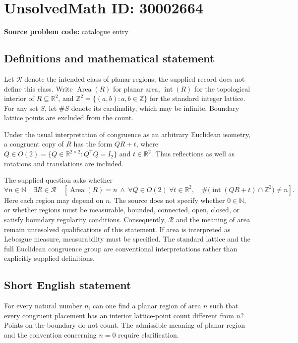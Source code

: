 \documentclass[11pt]{article}
\newcommand{\N}{\mathbb{N}}
\newcommand{\Z}{\mathbb{Z}}
\newcommand{\R}{\mathbb{R}}
\begin{document}
\section*{UnsolvedMath ID: 30002664}
\textbf{Source problem code:} catalogue entry
\subsection{Definitions and mathematical statement}
Let \(\mathcal R\) denote the intended class of planar regions; the supplied record does not define this class. Write \(\operatorname{Area}(R)\) for planar area, \(\operatorname{int}(R)\) for the topological interior of \(R\subseteq\R^2\), and \(\Z^2=\{(a,b):a,b\in\Z\}\) for the standard integer lattice. For any set \(S\), let \(\#S\) denote its cardinality, which may be infinite. Boundary lattice points are excluded from the count.

Under the usual interpretation of congruence as an arbitrary Euclidean isometry, a congruent copy of \(R\) has the form \(QR+t\), where \(Q\in O(2)=\{Q\in\R^{2\times2}:Q^{\mathsf T}Q=I_2\}\) and \(t\in\R^2\). Thus reflections as well as rotations and translations are included.

The supplied question asks whether
\[
\forall n\in\N\quad \exists R\in\mathcal R\quad
\left[\operatorname{Area}(R)=n\ \land\
\forall Q\in O(2)\ \forall t\in\R^2,\quad
\#\bigl(\operatorname{int}(QR+t)\cap\Z^2\bigr)\ne n\right].
\]
Here each region may depend on \(n\). The source does not specify whether \(0\in\N\), or whether regions must be measurable, bounded, connected, open, closed, or satisfy boundary regularity conditions. Consequently, \(\mathcal R\) and the meaning of area remain unresolved qualifications of this statement. If area is interpreted as Lebesgue measure, measurability must be specified. The standard lattice and the full Euclidean congruence group are conventional interpretations rather than explicitly supplied definitions.
\subsection{Short English statement}
For every natural number \(n\), can one find a planar region of area \(n\) such that every congruent placement has an interior lattice-point count different from \(n\)? Points on the boundary do not count. The admissible meaning of planar region and the convention concerning \(n=0\) require clarification.
\end{document}
